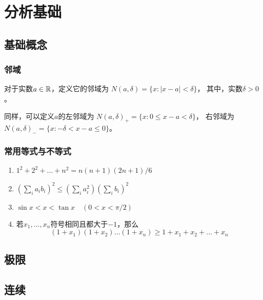 \chapter{分析基础}

\section{基础概念}
\subsection{邻域}
对于实数$a\in\mathbb{R}$，定义它的邻域为
$N(a,\delta) = \{ x: |x-a| < \delta \}$，
其中，实数$\delta > 0$。

同样，可以定义$a$的左邻域为
$N(a,\delta)_+ = \{ x: 0 \le x - a < \delta \}$，
右邻域为
$N(a,\delta)_- = \{ x: -\delta < x - a \le 0  \}$。

\subsection{常用等式与不等式}
\begin{enumerate}
  \item
  $1^2+2^2+\dots +n^2 = n(n+1)(2n+1)/6$
  \item
  $(\sum_{i}a_i b_i)^2 \le (\sum_{i}a_i^2)(\sum_{i}b_i)^2$
  \item
  $\sin x < x < \tan x \quad (0 < x < \pi/2)$
  \item
  若$x_1,\dots,x_n$符号相同且都大于$-1$，那么
  \[(1+x_1)(1+x_2)\dots(1+x_n)\ge 1+x_1+x_2+\dots+x_n\]
\end{enumerate}

\section{极限}

\section{连续}
